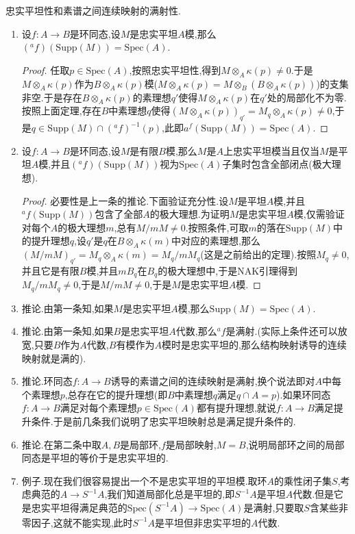 忠实平坦性和素谱之间连续映射的满射性.
\begin{enumerate}
	\item 设$f:A\to B$是环同态,设$M$是忠实平坦$A$模,那么$(^af)(\mathrm{Supp}(M))=\mathrm{Spec}(A)$.
	\begin{proof}
		
		任取$p\in\mathrm{Spec}(A)$,按照忠实平坦性,得到$M\otimes_A\kappa(p)\not=0$.于是$M\otimes_A\kappa(p)$作为$B\otimes_A\kappa(p)$模($M\otimes_A\kappa(p)=M\otimes_B(B\otimes_A\kappa(p))$)的支集非空.于是存在$B\otimes_A\kappa(p)$的素理想$q'$使得$M\otimes_A\kappa(p)$在$q'$处的局部化不为零.按照上面定理,存在$B$中素理想$q$使得$(M\otimes_A\kappa(p))_{q'}=M_q\otimes_A\kappa(p)\not=0$,于是$q\in\mathrm{Supp}(M)\cap(^af)^{-1}(p)$,此即$a^f(\mathrm{Supp}(M))=\mathrm{Spec}(A)$.
	\end{proof}
	\item 设$f:A\to B$是环同态,设$M$是有限$B$模,那么$M$是$A$上忠实平坦模当且仅当$M$是平坦$A$模,并且$(^af)(\mathrm{Supp}(M))$视为$\mathrm{Spec}(A)$子集时包含全部闭点(极大理想).
	\begin{proof}
		
		必要性是上一条的推论.下面验证充分性.设$M$是平坦$A$模,并且$^af(\mathrm{Supp}(M))$包含了全部$A$的极大理想.为证明$M$是忠实平坦$A$模,仅需验证对每个$A$的极大理想$m$,总有$M/mM\not=0$.按照条件,可取$m$的落在$\mathrm{Supp}(M)$中的提升理想$q$,设$q'$是$q$在$B\otimes_A\kappa(m)$中对应的素理想,那么$(M/mM)_{q'}=M_q\otimes_A\kappa(m)=M_q/mM_q$(这是之前给出的定理).按照$M_q\not=0$,并且它是有限$B$模,并且$mB_q$在$B_q$的极大理想中,于是NAK引理得到$M_q/mM_q\not=0$,于是$M/mM\not=0$,于是$M$是忠实平坦$A$模.
	\end{proof}
	\item 推论.由第一条知,如果$M$是忠实平坦$A$模,那么$\mathrm{Supp}(M)=\mathrm{Spec}(A)$.
	\item 推论.由第一条知,如果$B$是忠实平坦$A$代数,那么$^af$是满射.(实际上条件还可以放宽,只要$B$作为$A$代数,$B$有模作为$A$模时是忠实平坦的,那么结构映射诱导的连续映射就是满的).
	\item 推论.环同态$f:A\to B$诱导的素谱之间的连续映射是满射,换个说法即对$A$中每个素理想$p$,总存在它的提升理想(即$B$中素理想$q$满足$q\cap A=p$).如果环同态$f:A\to B$满足对每个素理想$p\in\mathrm{Spec}(A)$都有提升理想,就说$f:A\to B$满足提升条件.于是前几条我们说明了忠实平坦映射总是满足提升条件的.
	\item 推论.在第二条中取$A,B$是局部环,$f$是局部映射,$M=B$,说明局部环之间的局部同态是平坦的等价于是忠实平坦的.
	\item 例子.现在我们很容易提出一个不是忠实平坦的平坦模.取环$A$的乘性闭子集$S$,考虑典范的$A\to S^{-1}A$,我们知道局部化总是平坦的,即$S^{-1}A$是平坦$A$代数.但是它是忠实平坦得满足典范的$\mathrm{Spec}(S^{-1}A)\to\mathrm{Spec}(A)$是满射,只要取$S$含某些非零因子,这就不能实现,此时$S^{-1}A$是平坦但非忠实平坦的$A$代数.
\end{enumerate}

